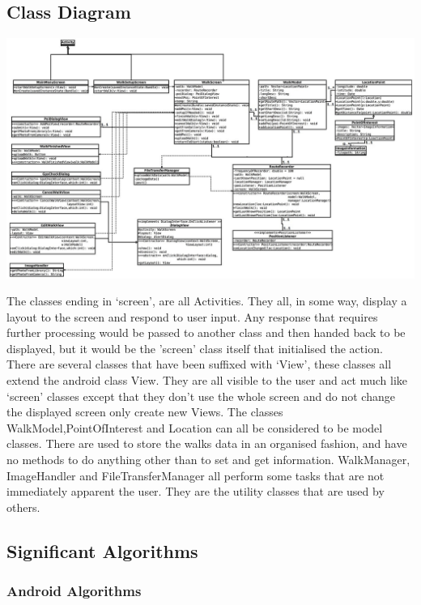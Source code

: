 \documentclass[12pt]{article}
\begin{document}
\subsection{Class Diagram}
\begin{landscape}
\begin{adjustwidth}{0.5cm}{2cm}
\includegraphics[scale=2.74253]{Design/class_diagram_new.jpg}
\end{adjustwidth}
\end{landscape}
\restoregeometry
The classes ending in ‘screen’, are all Activities. They all, in some way, display a layout to the screen and respond to user input. Any response that requires further processing would be passed to another class and then handed back to be displayed, but it would be the ’screen’ class itself that initialised the action.  
There are several classes that have been suffixed with ‘View’, these classes all extend the android class View. They are all visible to the user and act much like ‘screen’ classes except that they don’t use the whole screen and do not change the displayed screen only create new Views.  
The classes WalkModel,PointOfInterest and Location can all be considered to be model classes. There are used to store the walks data in an organised fashion, and have no methods to do anything other than to set and get information.  
WalkManager, ImageHandler and FileTransferManager all perform some tasks that are not immediately apparent the user. They are the utility classes that are used by others.
\subsection{Significant Algorithms}
\subsubsection{Android Algorithms}
\end{document}
